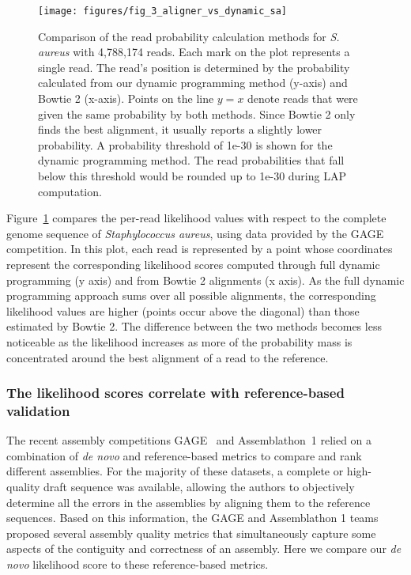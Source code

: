 \begin{figure}[h!]
\begin{center}
\texttt{[image: figures/fig\_3\_aligner\_vs\_dynamic\_sa]}
\end{center}
\renewcommand{\baselinestretch}{1}
\small\normalsize
\begin{quote}
\caption[Comparison of the read probability calculation methods]{Comparison of the read probability calculation methods for
    \emph{S. aureus} with 4,788,174 reads. Each mark on the plot
    represents a single read.  The read's position is determined by
    the probability calculated from our dynamic programming method (y-axis)
    and Bowtie 2 (x-axis).  Points on the line $y=x$ denote reads that were
    given the same probability by both methods.  Since Bowtie 2 only
    finds the best alignment, it usually reports a slightly lower
    probability.  A probability threshold of 1e-30 is shown for the
    dynamic programming method.  The read probabilities that fall below
    this threshold would be rounded up to 1e-30 during LAP computation.}
\label{fig:aligner_vs_dynamic}
\end{quote}
\end{figure}
\renewcommand{\baselinestretch}{2}
\small\normalsize

Figure~\ref{fig:aligner_vs_dynamic} compares the per-read likelihood
values with respect to the complete genome sequence of
\emph{Staphylococcus aureus}, using data provided by the GAGE
competition.  In this plot, each read is represented by a point whose
coordinates represent the corresponding likelihood scores computed
through full dynamic programming (y axis) and from Bowtie 2 alignments
(x axis). As the full dynamic programming approach sums over all
possible alignments, the corresponding likelihood values are higher
(points occur above the diagonal) than those estimated by Bowtie 2.
The difference between the two methods becomes less noticeable as the
likelihood increases as more of the probability mass is concentrated
around the best alignment of a read to the reference.

\subsubsection{The likelihood scores correlate with reference-based
  validation}

The recent assembly competitions GAGE~\cite{salzberg2011gage} and Assemblathon~1
\cite{earl2011assemblathon} relied on a combination of \emph{de novo} and
reference-based metrics to compare and rank different assemblies. For
the majority of these datasets, a complete or high-quality draft
sequence was available, allowing the authors to objectively determine
all the errors in the assemblies by aligning them to the reference
sequences. Based on this information, the GAGE and Assemblathon 1
teams proposed several assembly quality metrics that simultaneously
capture some aspects of the contiguity and correctness of an assembly.  Here we
compare our \emph{de novo} likelihood score to these reference-based
metrics.

